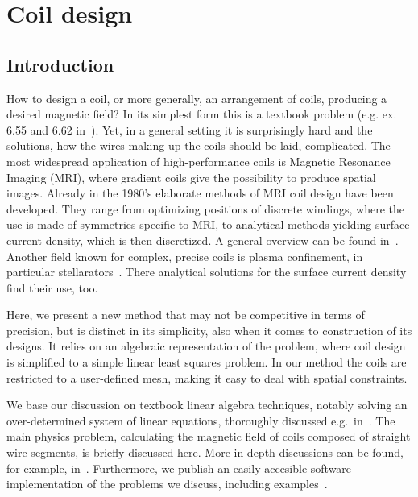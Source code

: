 \chapter{Coil design} %
\label{ch:coil_design}

\section{Introduction}
How to design a coil, or more generally, an arrangement of coils, producing a desired magnetic field? In its simplest form this is a textbook problem (e.g. ex. 6.55 and 6.62 in~\cite{Purcell}). Yet, in a general setting it is surprisingly hard and the solutions, how the wires making up the coils should be laid, complicated. The most widespread application of high-performance coils is Magnetic Resonance Imaging (MRI), where gradient coils give the possibility to produce spatial images. Already in the 1980's elaborate methods of MRI coil design have been developed. They range from optimizing positions of discrete windings, where the use is made of symmetries specific to MRI, to analytical methods yielding surface current density, which is then discretized. A general overview can be found in~\cite{Turner1993}. Another field known for complex, precise coils is plasma confinement, in particular stellarators~\cite{Beidler1990}. There analytical solutions for the surface current density find their use, too.


Here, we present a new method that may not be competitive in terms of precision, but is distinct in its simplicity, also when it comes to construction of its designs. It relies on an algebraic representation of the problem, where coil design is simplified to a simple linear least squares problem. In our method the coils are restricted to a user-defined mesh, making it easy to deal with spatial constraints.

We base our discussion on textbook linear algebra techniques, notably solving an over-determined system of linear equations, thoroughly discussed e.g.\ in~\cite{Anton}. The main physics problem, calculating the magnetic field of coils composed of straight wire segments, is briefly discussed here. More in-depth discussions can be found, for example, in~\cite{Griffith}. Furthermore, we publish an easily accesible software implementation of the problems we discuss, including examples~\cite{Coilsjlcode}.

